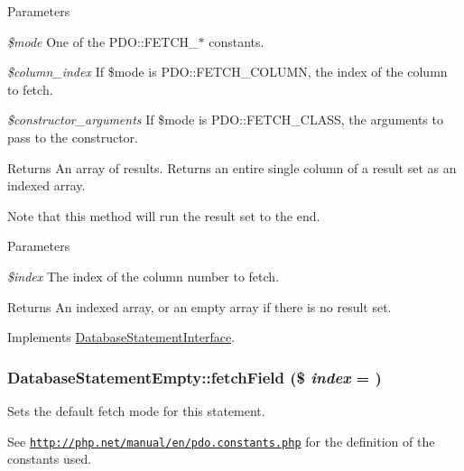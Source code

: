 \begin{DoxyParams}{Parameters}
\item[{\em \$mode}]One of the PDO::FETCH\_\-$\ast$ constants. \item[{\em \$column\_\-index}]If \$mode is PDO::FETCH\_\-COLUMN, the index of the column to fetch. \item[{\em \$constructor\_\-arguments}]If \$mode is PDO::FETCH\_\-CLASS, the arguments to pass to the constructor.\end{DoxyParams}
\begin{DoxyReturn}{Returns}
An array of results. Returns an entire single column of a result set as an indexed array.
\end{DoxyReturn}
Note that this method will run the result set to the end.


\begin{DoxyParams}{Parameters}
\item[{\em \$index}]The index of the column number to fetch.\end{DoxyParams}
\begin{DoxyReturn}{Returns}
An indexed array, or an empty array if there is no result set. 
\end{DoxyReturn}


Implements \hyperlink{interfaceDatabaseStatementInterface_a1c66bf4ef84ffd4710fa6545974cdf23}{DatabaseStatementInterface}.\hypertarget{classDatabaseStatementEmpty_a0cadfb54ef7906aaaf57d7278ab6bb27}{
\subsubsection[{fetchField}]{\setlength{\rightskip}{0pt plus 5cm}DatabaseStatementEmpty::fetchField (\$ {\em index} = {})}}
\label{classDatabaseStatementEmpty_a0cadfb54ef7906aaaf57d7278ab6bb27}
Sets the default fetch mode for this statement.

See \href{http://php.net/manual/en/pdo.constants.php}{\tt http://php.net/manual/en/pdo.constants.php} for the definition of the constants used.


